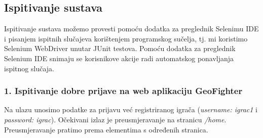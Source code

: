 			
			\eject
			
			\subsection{Ispitivanje sustava}
			
			 
			
			{Ispitivanje sustava možemo provesti pomoću dodatka za preglednik Selenimu IDE i pisanjem ispitnih slučajeva korištenjem programskog sučelja, tj. mi koristimo Selenium WebDriver unutar JUnit testova. Pomoću dodatka za preglednik Selenium IDE snimaju se korisnikove akcije radi automatskog ponavljanja ispitnog slučaja.} 
			
			\subsubsection	{1. Ispitivanje dobre prijave na web aplikaciju GeoFighter }
			
				{Na ulazu unosimo podatke za prijavu već registriranog igrača (\emph{username: igrac1} i \emph{password: igrac}). Očekivani izlaz je preusmjeravanje na stranicu \emph{/home}. Preusmjeravanje pratimo prema elementima s određenih stranica. }
				
